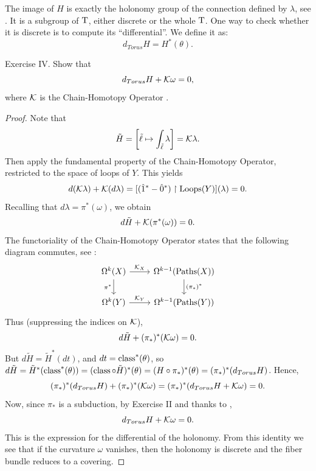 The image of $H$ is exactly the holonomy group of the connection defined by $\lambda$,
see \cite[\textsection\,8.35]{PIZ13}.
It is a subgroup of $\mathrm{T}$,
either discrete or the whole $\mathrm{T}$.
One way to check whether it is discrete is to compute its ``differential''.
We define it as:
$$%
  d_{Torus} H = H^*(\theta).
  $$%

\begin{Article}{Exercise IV.}{}
  Show that
  $$%
    d_{Torus} H + \cK\omega = 0,
    $$%
  where $\mathcal{K}$ is the Chain-Homotopy Operator \cite[\textsection\,6.83]{PIZ13}.
\end{Article}

\begin{proof}
  Note that
  $$%
  \tilde H = \left[ \tilde \ell \mapsto \int_{\tilde \ell}\lambda \right] = \cK\lambda.
    $$%
  Then apply the fundamental property of the Chain-Homotopy Operator,
  restricted to the space of loops of $Y$.
  This yields
  $$%
    d(\cK\lambda) + \cK(d\lambda) = [(\hat1^*-\hat0^*)\restriction \Loops(Y)](\lambda) = 0.
    $$%
  Recalling that $d\lambda = \pi^*(\omega)$,
  we obtain
  $$%
    d\tilde H + \cK(\pi^*(\omega)) = 0.
    $$%
  The functoriality of the Chain-Homotopy Operator states that the following diagram commutes,
  see \cite[\textsection\,6.84]{PIZ13}:
  \[
  \begin{tikzcd}
    \DForms^k(X) \arrow{r}{\cK_X} \arrow{d}[swap]{\pi^*}       & \DForms^{k-1}(\Paths(X))  \arrow{d}{(\pi_*)^*} \\
    \DForms^k(Y) \arrow{r}{\cK_Y}                          & \DForms^{k-1}(\Paths(Y))
  \end{tikzcd}
  \]
  Thus (suppressing the indices on $\mathcal{K}$),
  $$%
    d\tilde H + (\pi_*)^*(\cK\omega) = 0.
    $$%
  But $d\tilde H = \tilde H^*(dt)$,
  and $dt = \operatorname{class}^*(\theta)$,
  so $d\tilde H = \tilde H^*(\operatorname{class}^*(\theta)) = (\operatorname{class}\circ\tilde H)^*(\theta) = ( H \circ \pi_*)^*(\theta) = (\pi_*)^*(d_{Torus} H)$.
  Hence,
  $$%
    (\pi_*)^*(d_{Torus} H) + (\pi_*)^*(\cK\omega) = (\pi_*)^*(d_{Torus} H + \cK\omega) = 0.
    $$%
  Now,
  since $\pi_*$ is a subduction,
  by Exercise II and thanks to \cite[\textsection\,6.39]{PIZ13},
  $$%
    d_{Torus} H + \cK\omega = 0.
    $$%
  This is the expression for the differential of the holonomy.
  From this identity we see that if the curvature $\omega$ vanishes,
  then the holonomy is discrete and the fiber bundle reduces to a covering.
\end{proof}

